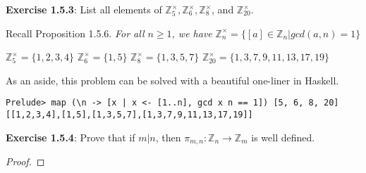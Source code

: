 \documentclass[a4paper]{article}
\begin{document}
\begin{myparindent}{0pt}
\textbf{Exercise 1.5.3}:
List all elements of $\mathbb{Z}_5^\times, \mathbb{Z}_6^\times, \mathbb{Z}_8^\times$, and $\mathbb{Z}_{20}^\times$.
\newline

Recall Proposition 1.5.6. \textit{For all $n \ge 1$, we have} $\mathbb{Z}_n^\times = \{ [a] \in \mathbb{Z}_n | gcd(a, n) = 1 \}$ \newline

$\mathbb{Z}_5^\times = \{ 1, 2, 3, 4 \}$ \newline
$\mathbb{Z}_6^\times = \{ 1, 5 \}$ \newline
$\mathbb{Z}_8^\times = \{ 1, 3, 5, 7 \}$ \newline
$\mathbb{Z}_{20}^\times = \{ 1, 3, 7, 9, 11, 13, 17, 19 \}$ \newline

As an aside, this problem can be solved with a beautiful one-liner in Haskell. \
\begin{verbatim}
Prelude> map (\n -> [x | x <- [1..n], gcd x n == 1]) [5, 6, 8, 20]
[[1,2,3,4],[1,5],[1,3,5,7],[1,3,7,9,11,13,17,19]]
\end{verbatim}

\textbf{Exercise 1.5.4}:
Prove that if $m|n$, then $\pi_{m, n}: \mathbb{Z}_n \rightarrow \mathbb{Z}_m$ is well defined.

\begin{proof}
\end{proof}

\end{myparindent}
\end{document}

